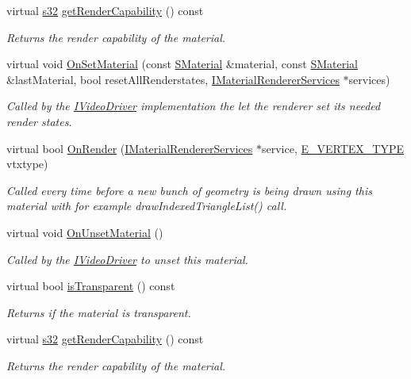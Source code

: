 \begin{DoxyCompactItemize}
virtual \hyperlink{namespaceirr_ac66849b7a6ed16e30ebede579f9b47c6}{s32} \hyperlink{classirr_1_1video_1_1IMaterialRenderer_a5ca13576cb3f466cf2cd9427926121fa}{get\+Render\+Capability} () const
\begin{DoxyCompactList}\small\item\em Returns the render capability of the material. \end{DoxyCompactList}\item 
virtual void \hyperlink{classirr_1_1video_1_1IMaterialRenderer_aeaffc03c1b9feb40cd01469726b287e3}{On\+Set\+Material} (const \hyperlink{classirr_1_1video_1_1SMaterial}{S\+Material} \&material, const \hyperlink{classirr_1_1video_1_1SMaterial}{S\+Material} \&last\+Material, bool reset\+All\+Renderstates, \hyperlink{classirr_1_1video_1_1IMaterialRendererServices}{I\+Material\+Renderer\+Services} $\ast$services)
\begin{DoxyCompactList}\small\item\em Called by the \hyperlink{classirr_1_1video_1_1IVideoDriver}{I\+Video\+Driver} implementation the let the renderer set its needed render states. \end{DoxyCompactList}\item 
virtual bool \hyperlink{classirr_1_1video_1_1IMaterialRenderer_a8cb6c5f93856de7586a318f14ed21a22}{On\+Render} (\hyperlink{classirr_1_1video_1_1IMaterialRendererServices}{I\+Material\+Renderer\+Services} $\ast$service, \hyperlink{namespaceirr_1_1video_a0e3b59e025e0d0db0ed2ee0ce904deac}{E\+\_\+\+V\+E\+R\+T\+E\+X\+\_\+\+T\+Y\+PE} vtxtype)
\begin{DoxyCompactList}\small\item\em Called every time before a new bunch of geometry is being drawn using this material with for example draw\+Indexed\+Triangle\+List() call. \end{DoxyCompactList}\item 
virtual void \hyperlink{classirr_1_1video_1_1IMaterialRenderer_a694b1285671853cb151c03100fd01c73}{On\+Unset\+Material} ()
\begin{DoxyCompactList}\small\item\em Called by the \hyperlink{classirr_1_1video_1_1IVideoDriver}{I\+Video\+Driver} to unset this material. \end{DoxyCompactList}\item 
virtual bool \hyperlink{classirr_1_1video_1_1IMaterialRenderer_ac472a5832eed8d848240c82278e56312}{is\+Transparent} () const
\begin{DoxyCompactList}\small\item\em Returns if the material is transparent. \end{DoxyCompactList}\item 
virtual \hyperlink{namespaceirr_ac66849b7a6ed16e30ebede579f9b47c6}{s32} \hyperlink{classirr_1_1video_1_1IMaterialRenderer_a5ca13576cb3f466cf2cd9427926121fa}{get\+Render\+Capability} () const
\begin{DoxyCompactList}\small\item\em Returns the render capability of the material. \end{DoxyCompactList}\end{DoxyCompactItemize}

